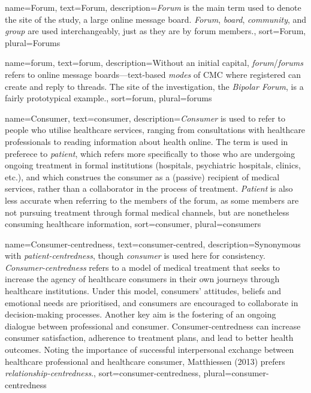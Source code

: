 
{
  name=Forum,
  text=Forum,
  description={\emph{Forum} is the main term used to denote the site of the study, a large online  message board. \emph{Forum}, \emph{board}, \emph{community}, and \emph{group} are used interchangeably, just as they are by forum \glspl{member}.},
  sort=Forum,
  plural=Forums
}

{
  name=forum,
  text=forum,
  description={Without an initial capital, \emph{forum}\slash \emph{forums} refers to online message boards---text-based \emph{modes} of \gls{CMC} where registered  can create and reply to \glspl{thread}. The site of the investigation, the \emph{Bipolar \gls{Forum}}, is a fairly prototypical example.},
  sort=forum,
  plural=forums
}

{
  name=Consumer,
  text=consumer,
  description={\emph{Consumer} is used to refer to people who utilise healthcare services, ranging from consultations with healthcare professionals to reading information about health online. The term is used in preferece to \emph{patient}, which refers more specifically to those who are undergoing ongoing treatment in formal institutions (hospitals, psychiatric hospitals, clinics, etc.), and which construes the consumer as a (passive) recipient of medical services, rather than a collaborator in the process of treatment. \emph{Patient} is also less accurate when referring to the members of the \gls{forum}, as some members are not pursuing treatment through formal medical channels, but are nonetheless consuming healthcare information},
  sort=consumer,
  plural=consumers
}

{
  name=Consumer-centredness,
  text=consumer-centred,
  description={Synonymous with \emph{patient-centredness}, though \emph{consumer} is used here for consistency. \emph{Consumer-centredness} refers to a model of medical treatment that seeks to increase the agency of healthcare \glspl{consumer} in their own journeys through healthcare institutions. Under this model, \glspl{consumer}' attitudes, beliefs and emotional needs are prioritised, and \glspl{consumer} are encouraged to collaborate in decision-making processes. Another key aim is the fostering of an ongoing dialogue between professional and consumer. Consumer-centredness can increase consumer satisfaction, adherence to treatment plans, and lead to better health outcomes. Noting the importance of successful interpersonal exchange between healthcare professional and healthcare consumer, Matthiessen (2013) prefers \emph{relationship-centredness}.},
  sort=consumer-centredness,
  plural=consumer-centredness
}

